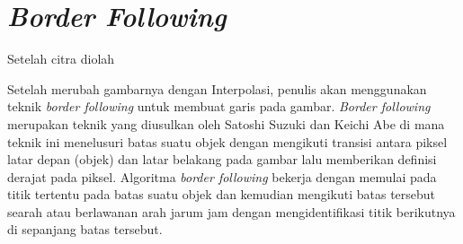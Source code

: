 \section{\textit{Border Following}}

Setelah citra diolah 

Setelah merubah gambarnya dengan Interpolasi, penulis 
akan menggunakan teknik \textit{border following} untuk membuat garis 
pada gambar. \textit{Border following} merupakan teknik yang diusulkan 
oleh Satoshi Suzuki dan Keichi Abe di mana teknik ini menelusuri 
batas suatu objek dengan mengikuti transisi antara piksel latar 
depan (objek) dan latar belakang pada gambar lalu memberikan 
definisi derajat pada piksel. Algoritma \textit{border following} bekerja 
dengan memulai pada titik tertentu pada batas suatu objek dan 
kemudian mengikuti batas tersebut searah atau berlawanan 
arah jarum jam dengan mengidentifikasi titik berikutnya di 
sepanjang batas tersebut.


